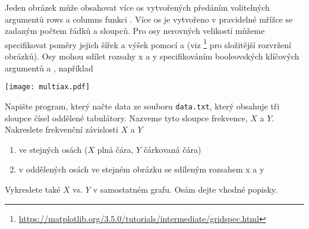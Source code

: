 Jeden obrázek může obsahovat více os vytvořených předáním volitelných argumentů rows a columns funkci . Více os je vytvořeno v pravidelné mřížce se zadaným počtem řádků a sloupců. Pro osy nerovných velikostí můžeme specifikovat poměry jejich šířek a výšek pomocí  a  (viz  \footnote{\url{https://matplotlib.org/3.5.0/tutorials/intermediate/gridspec.html}} pro složitější rozvržení obrázků). Osy mohou sdílet rozsahy x a y specifikováním booleovských klíčových argumentů  a , například

\begin{center}
    \texttt{[image: multiax.pdf]}
\end{center}
\begin{exercise}
    \label{ex:peak}
    Napište program, který načte data ze souboru \verb|data.txt|, který obsahuje tři sloupce čísel oddělené tabulátory. Nazveme tyto sloupce frekvence, $X$ a $Y$. Nakreslete frekvenční závislosti $X$ a $Y$
    \begin{enumerate}
        \item ve stejných osách ($X$ plná čára, $Y$ čárkovaná čára)
        \item v oddělených osách ve stejném obrázku se sdíleným rozsahem x a y
    \end{enumerate}
    Vykreslete také $X$ vs. $Y$ v samostatném grafu. Osám dejte vhodné popisky.
\end{exercise}
